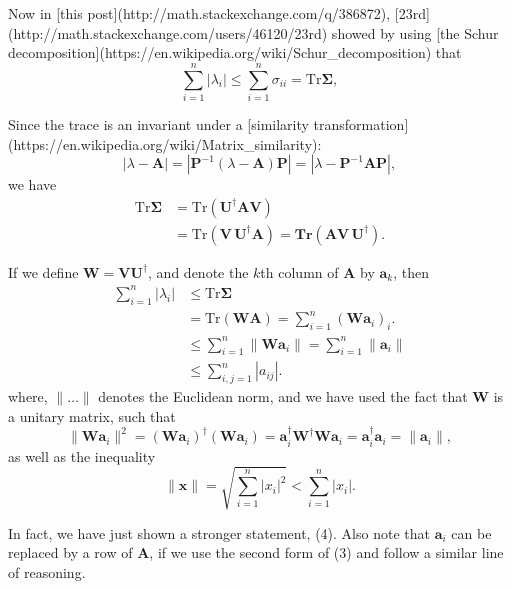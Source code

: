 Now in [this post](http://math.stackexchange.com/q/386872), [23rd](http://math.stackexchange.com/users/46120/23rd) showed by using [the Schur decomposition](https://en.wikipedia.org/wiki/Schur_decomposition) that
$$
\sum_{i = 1}^n |\lambda_i|
\le \sum_{i = 1}^n \sigma_{ii}
= \mathrm{Tr} \mathbf \Sigma,
\tag{2}
$$

Since the trace is an invariant under a [similarity transformation](https://en.wikipedia.org/wiki/Matrix_similarity):
$$
|\lambda - \mathbf A| = |\mathbf P^{-1}(\lambda - \mathbf A)\mathbf P| = |\lambda - \mathbf P^{-1} \mathbf A \mathbf P|,
$$
we have
\begin{align}
\mathrm{Tr} \mathbf \Sigma
&=
\mathrm{Tr} \left(
  \mathbf U^\dagger \mathbf A \mathbf V
\right) \\
&=
\mathrm{Tr} \left(
  \mathbf V \, \mathbf U^\dagger \mathbf A
\right)
=
\mathbf{Tr} \left(
  \mathbf A \mathbf V \, \mathbf U^\dagger
\right)
.
\tag{3}
\end{align}

If we define $\mathbf W = \mathbf V \mathbf U^\dagger$,
and denote the $k$th column of $\mathbf A$ by $\mathbf a_k$,
then
\begin{align}
\sum_{i = 1}^n |\lambda_i|
&\le
\mathrm{Tr} \mathbf \Sigma \\
&=
\mathrm{Tr} \left(
  \mathbf W \mathbf A
\right)
=
\sum_{i = 1}^n
\left(
\mathbf W \mathbf a_i \right)_i.
\\
&\le
\sum_{i = 1}^n
\| \mathbf W \mathbf a_i  \|
=
\sum_{i = 1}^n
\| \mathbf a_i  \|
\tag{4}
\\
&\le \sum_{i,j=1}^n |a_{ij}|.
\end{align}
where, $\| \dots \|$ denotes the Euclidean norm,
and we have used the fact that $\mathbf W$
is a unitary matrix, such that
$$
\| \mathbf W \mathbf a_i \|^2
=
(\mathbf W \mathbf a_i)^\dagger
(\mathbf W \mathbf a_i)
=
\mathbf a_i^\dagger \mathbf W^\dagger
\mathbf W \mathbf a_i
=
\mathbf a_i^\dagger \mathbf a_i = \| \mathbf a_i \|,
$$
as well as the inequality
$$
\| \mathbf x \|
= \sqrt{ \sum_{i = 1}^n |x_i|^2 }
< \sum_{i = 1}^n |x_i|.
$$

In fact, we have just shown a stronger statement, (4).
Also note that $\mathbf a_i$ can be replaced
by a row of $\mathbf A$, if we use the second form of (3)
and follow a similar line of reasoning.


